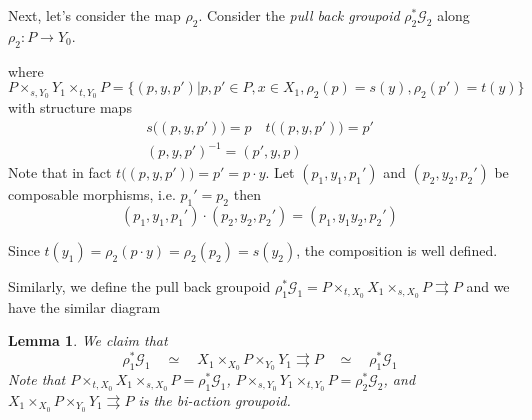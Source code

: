 \documentclass[12pt]{amsart}
\newtheorem{lem}[thm]{Lemma}
\theoremstyle{definition}
\theoremstyle{remark}
\numberwithin{equation}{section}
\newcommand{\CG}{{\mathcal G}}
\begin{document}
Next, let's consider the  map $\rho_2$. Consider the {\it pull back groupoid} $\rho_2^* \CG_2$  along $\rho_2: P\to Y_0$. 
	\begin{center}
\end{center}
where
\begin{equation}
P \times_{s,Y_0} Y_1\times_{t,Y_0} P=\{(p,y,p') | p, p'\in P, x\in X_1, \rho_2(p)=s(y), \rho_2(p')=t(y) \}
\end{equation}
with structure maps
\begin{align*}
	s\big((p,y,p') \big)=p \quad t\big((p,y,p') \big)=p'\\
	 (p,y,p')^{-1}=(p',y,p)  
\end{align*}
Note that in fact $t\big((p,y,p') \big)=p'=p\cdot y$. 
Let $(p_1,y_1,p_1')$ and $(p_2,y_2,p_2')$ be composable morphisms, i.e. $p_1'=p_2$ then
\begin{equation*}
(p_1,y_1,p_1')\cdot (p_2,y_2,p_2')= (p_1, y_1y_2, p_2')
\end{equation*}

Since $t(y_1)= \rho_2(p\cdot y)=\rho_2(p_2)=s(y_2)$, the composition is well defined.

Similarly, we define the pull back groupoid  $\rho_1^*\CG_1= P \times_{t,X_0} X_1\times_{s,X_0} P \rightrightarrows P$ and we have the similar diagram
	\begin{center}
\end{center}

\begin{lem} We claim that 
	\begin{equation}
\rho_1^*\CG_1 \quad \simeq \quad X_1\times_{X_0} P\times_{Y_0} Y_1 \rightrightarrows P  \quad\simeq\quad \rho_1^*\CG_1
	\end{equation} Note that  $P \times_{t,X_0} X_1\times_{s,X_0} P=\rho_1^* \CG_1$, $ P \times_{s,Y_0} Y_1\times_{t,Y_0} P=\rho_2^*\CG_2$, and $X_1\times_{X_0} P\times_{Y_0} Y_1\rightrightarrows P$ is the bi-action groupoid.
	\end{lem}
\end{document}
